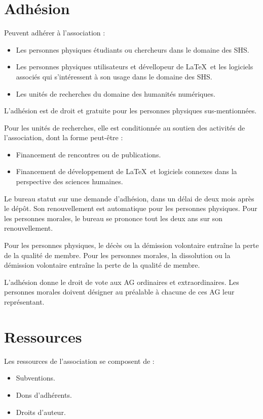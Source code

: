 \documentclass[11pt]{article}
\begin{document}
\section{Adhésion}
Peuvent adhérer à l'association :
\begin{itemize}
	\item Les personnes physiques étudiants ou chercheurs dans le domaine des SHS.
	\item Les personnes physiques utilisateurs et dévellopeur de \LaTeX\ et les logiciels associés qui s'intéressent à son usage dans le domaine des SHS.
	\item Les unités de recherches du domaine des humanités numériques.
\end{itemize}

L'adhésion est de droit et gratuite pour les personnes physiques sus-mentionnées. 

Pour les unités de recherches, elle est conditionnée au soutien des activités de l'association, dont la forme peut-être :
\begin{itemize}
	\item Financement de rencontres ou de publications.
	\item Financement de développement de \LaTeX\ et logiciels connexes dans  la perspective des sciences humaines.
\end{itemize}

Le bureau statut sur une demande d'adhésion, dans un délai de deux mois après le dépôt.
Son renouvellement est automatique pour les personnes physiques. 
Pour les personnes morales, le bureau se prononce tout les deux ans sur son renouvellement.

Pour les personnes physiques, le décès ou la démission volontaire entraîne la perte de la qualité de membre.
Pour les personnes morales, la dissolution ou la démission volontaire entraîne la perte de la qualité de membre. 

L'adhésion donne le droit de vote aux AG ordinaires et extraordinaires. Les personnes morales doivent désigner au préalable à chacune de ces AG leur représentant.
\section{Ressources}

Les ressources de l'association se composent de :
\begin{itemize}
	\item Subventions.
	\item Dons d'adhérents.
	\item Droits d'auteur.
\end{itemize}
\end{document}
